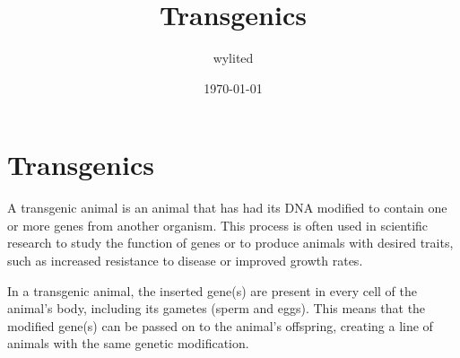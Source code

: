 \documentclass[11pt]{article}
\author{wylited}
\date{\today}
\title{Transgenics}
\begin{document}
\maketitle
\tableofcontents


\section{Transgenics}
\label{sec:org65ca2be}
A transgenic animal is an animal that has had its DNA modified to contain one or more genes from another organism. This process is often used in scientific research to study the function of genes or to produce animals with desired traits, such as increased resistance to disease or improved growth rates.

In a transgenic animal, the inserted gene(s) are present in every cell of the animal's body, including its gametes (sperm and eggs). This means that the modified gene(s) can be passed on to the animal's offspring, creating a line of animals with the same genetic modification.
\end{document}
